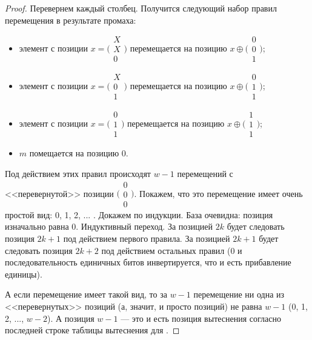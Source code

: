 \begin{proof}
Перевернем каждый столбец. Получится следующий набор правил перемещения в результате промаха:
\begin{itemize}
    \item элемент с позиции $x = \bigl(\begin{smallmatrix}X\\X\\0\end{smallmatrix}\bigr)$ перемещается на позицию $x \oplus \bigl(\begin{smallmatrix}0\\0\\1 \end{smallmatrix}\bigr)$;
    \item элемент с позиции $x = \bigl(\begin{smallmatrix}X\\0\\1\end{smallmatrix}\bigr)$ перемещается на позицию $x \oplus \bigl(\begin{smallmatrix}0\\1\\1\end{smallmatrix}\bigr)$;
    \item элемент с позиции $x = \bigl(\begin{smallmatrix}0\\1\\1\end{smallmatrix}\bigr)$ перемещается на позицию $x \oplus \bigl(\begin{smallmatrix}1\\1\\1\end{smallmatrix}\bigr)$;
    \item $m$ помещается на позицию 0.
\end{itemize}

Под действием этих правил происходят $w{-}1$ перемещений с <<перевернутой>> позиции $\bigl(\begin{smallmatrix}0\\0\\0\end{smallmatrix}\bigr)$. Покажем, что это перемещение имеет очень простой вид: 0, 1, 2, ... . Докажем по индукции. База очевидна: позиция изначально равна 0. Индуктивный переход. За позицией $2k$ будет следовать позиция $2k+1$ под действием первого правила. За позицией $2k+1$ будет следовать позиция $2k+2$ под действием остальных правил (0 и последовательность единичных битов инвертируется, что и есть прибавление единицы).

А если перемещение имеет такой вид, то за $w{-}1$ перемещение ни одна из <<перевернутых>> позиций (а, значит, и просто позиций) не равна $w{-}1$ (0, 1, 2, ..., $w{-}2$). А позиция $w{-}1$ --- это и есть позиция вытеснения согласно последней строке таблицы вытеснения для \PseudoLRU.
\end{proof}


